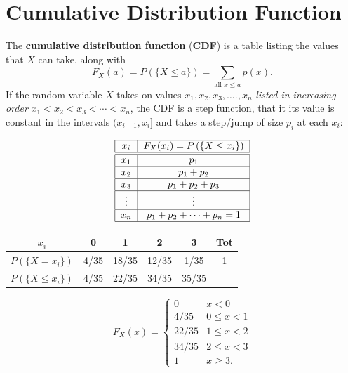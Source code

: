 \documentclass[smaller, handout]{beamer}\usepackage[]{graphicx}\usepackage[]{color}
\begin{document}
\section{Cumulative Distribution Function}
\begin{frame}{\secname}
  The \textbf{cumulative distribution function} (\textbf{CDF}) is a
  table listing the values that $X$ can take, along with
  $$
  F_X(a) = P \left(\{ X\leq a\}\right)= \sum_{\text{all \ \ } x \leq a } p(x).
  $$
  If the random variable $X$ takes on values $x_{1},x_{2},x_{3},\ldots .,x_{n}$ \emph{listed in
  increasing order } $
  x_{1}<x_{2}<x_{3}<\cdots <x_{n}
  $, the CDF is a step function, that it its value is constant in the intervals $(x_{i-1},x_i]$ and takes a step/jump of size $p_i$
  at each $x_i$:
  \vspace{0.1cm}

  \begin{equation*}
  \begin{tabular}{|c|c|}
  \hline
  $x_i $ & $F_X(x_i) =P \left(\{ X\leq x_i\}\right) $ \\ \hline\hline
  $x_{1}$ & $p_{1}$ \\ \hline
  $x_{2}$ & $p_{1}+p_{2}$ \\ \hline
  $x_{3}$ & $p_{1}+p_{2}+p_{3}$ \\ \hline
  $\vdots $ & $\vdots $ \\ \hline
  $x_{n}$ & $p_{1}+p_{2}+\cdots +p_{n}=1$ \\ \hline
  \end{tabular}%
  \end{equation*}
  \vspace{0.2cm}
\end{frame}%



\begin{frame}{\secname}
  \begin{example}
  \noindent
  \begin{center}
  \begin{tabular}{c|cccc|c}
  $x_i$ & 0 & 1 & 2 & 3 & Tot \\ \hline
  $P(\{X=x_i\})$ & 4/35 & 18/35 & 12/35 & 1/35 & 1 \\
  $P(\{X\leq x_i\})$ & 4/35 & 22/35 & 34/35 & 35/35 &
  \end{tabular}
  \end{center}
  \bigskip
  $$F_X(x) = \left\{
  \begin{array}{ll}
  0 & x<0 \\
  4/35 & 0 \leq x < 1\\
  22/35 & 1 \leq x < 2\\
  34/35 & 2 \leq x < 3 \\
  1 & x \geq 3.
  \end{array} \right.$$
  \end{example}
\end{frame}
\end{document}
